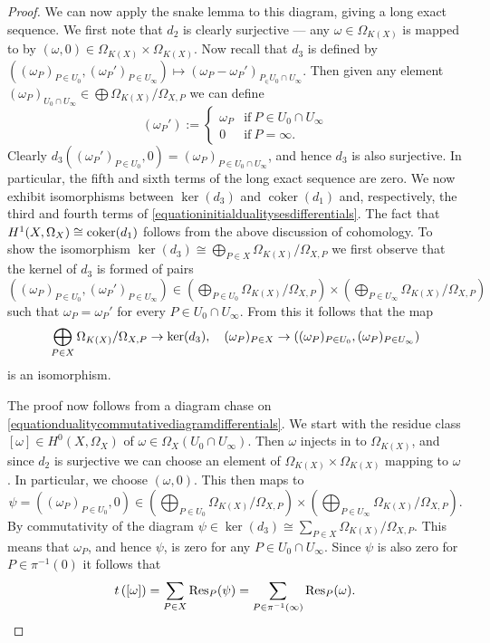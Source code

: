 \begin{proof}
    We can now apply the snake lemma to this diagram, giving a long exact sequence.
    We first note that $d_2$ is clearly surjective --- any $\omega \in \Omega_{K(X)}$ is mapped to by $(\omega, 0) \in \Omega_{K(X)} \times \Omega_{K(X)}$.
    Now recall that $d_3$ is defined by $((\omega_P)_{P \in U_0}, (\omega_P')_{P \in U_\infty}) \mapsto (\omega_P - \omega_P')_{P_ \in U_0 \cap U_\infty}$.
    Then given any element $(\omega_P)_{U_0 \cap U_\infty} \in \bigoplus \Omega_{K(X)}/\Omega_{X,P}$ we can define
        \[
        (\omega_P') := 
            \begin{cases}
            \omega_P & \text{if}\ P \in U_0 \cap U_\infty \\
            0 & \text{if} \ P = \infty.
            \end{cases}
        \]  
    Clearly $d_3((\omega_P')_{P \in U_0}, 0) = (\omega_P)_{P \in U_0 \cap U_\infty}$, and hence $d_3$ is also surjective.
    In particular, the fifth and sixth terms of the long exact sequence are zero.
    We now exhibit isomorphisms between $\ker(d_3)$ and $\operatorname{coker}(d_1)$ and, respectively, the third and fourth terms of \eqref{equationinitialdualitysesdifferentials}.
    The fact that $H^1(X,\Omega_X) \cong {\rm coker}(d_1)$ follows from the above discussion of \cech cohomology.
    To show the isomorphism $\ker(d_3) \cong \bigoplus_{P \in X} \Omega_{K(X)}/\Omega_{X,P}$ we first observe that the kernel of $d_3$ is formed of pairs $ ((\omega_P)_{P \in U_0}, (\omega_P')_{P \in U_\infty})\in \left( \bigoplus_{P \in U_0} \Omega_{K(X)}/\Omega_{X,P} \right) \times \left( \bigoplus_{P \in  U_\infty} \Omega_{K(X)}/\Omega_{X,P} \right)$ such that $\omega_P = \omega_P'$ for every $ P \in U_0 \cap U_\infty$.
    From this it follows that the map 
        \[
        \bigoplus_{P \in X} \Omega_{K(X)}/\Omega_{X,P}\rightarrow\ker(d_3), \quad  (\omega_P)_{P \in X} \to \left( (\omega_P)_{ P \in U_0}, (\omega_P)_{P \in U_\infty} \right)
        \]
    is an isomorphism.
    
    The proof now follows from a diagram chase on \eqref{equationdualitycommutativediagramdifferentials}.
    We start with the residue class $[ \omega ] \in H^0(X,\Omega_X)$ of $\omega \in \Omega_X(U_0 \cap U_\infty)$.
    Then $\omega$ injects in to $\Omega_{K(X)}$, and since $d_2$ is surjective we can choose an element of $\Omega_{K(X)} \times \Omega_{K(X)}$ mapping to $\omega$.
    In particular, we choose $(\omega,0)$.
    This then maps to 
        \[
        \psi = (({\omega}_P)_{P\in U_0}, 0) \in \left( \bigoplus_{P \in U_0} \Omega_{K(X)}/\Omega_{X,P}\right) \times \left( \bigoplus_{P \in U_\infty} \Omega_{K(X)}/\Omega_{X,P} \right).
        \]
    By commutativity of the diagram $\psi \in \ker(d_3) \cong \sum_{P \in X}\Omega_{K(X)}/\Omega_{X,P}$.
    This means that $\omega_P$, and hence $\psi$, is zero for any $P \in U_0 \cap U_\infty$.
    Since $\psi$ is also zero for $P \in \pi^{-1}(0)$ it follows that 
        \[
        t\left([ \omega ] \right) = \sum_{P \in X}\operatorname{Res}_P(\psi) = \sum_{P \in \pi^{-1}(\infty)} \operatorname{Res}_P(\omega).
        \]
    \end{proof}


